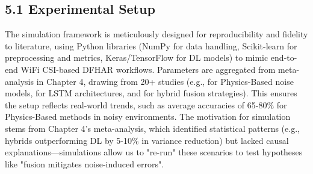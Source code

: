 \documentclass[Afour,sageh,times]{sagej}
\begin{document}

\subsection{5.1 Experimental Setup}
\label{subsec:experimental_setup}

The simulation framework is meticulously designed for reproducibility and fidelity to literature, using Python libraries (NumPy for data handling, Scikit-learn for preprocessing and metrics, Keras/TensorFlow for DL models) to mimic end-to-end WiFi CSI-based DFHAR workflows. Parameters are aggregated from meta-analysis in Chapter 4, drawing from 20+ studies (e.g., \citep{guo2019robust} for Physics-Based noise models, \citep{chen2018wifi} for LSTM architectures, and \citep{yang2022deep} for hybrid fusion strategies). This ensures the setup reflects real-world trends, such as average accuracies of 65-80\% for Physics-Based methods in noisy environments. The motivation for simulation stems from Chapter 4's meta-analysis, which identified statistical patterns (e.g., hybrids outperforming DL by 5-10\% in variance reduction) but lacked causal explanations—simulations allow us to "re-run" these scenarios to test hypotheses like "fusion mitigates noise-induced errors".
\end{document}
